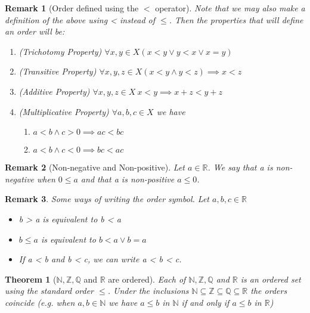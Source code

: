 \documentclass[11pt, oneside]{book}
\theoremstyle{break}
\newtheorem{thm}{Theorem}[section]
\newtheorem*{remark}{Remark}
\newcommand{\bb}[1]{\mathbb{#1}}		%
\begin{document}
\begin{remark}[Order defined using the $<$ operator]
	Note that we may also make a definition of the above using < instead of $\leq$. Then the properties that will define an order will be:
	\begin{enumerate}
		\item (Trichotomy Property) $\forall x, y \in X (x < y \lor y < x \lor x = y)$
		\item (Transitive Property) $\forall x, y, z \in X (x < y \land y < z) \implies x < z$
		\item (Additive Property) $\forall x, y, z \in X \> x < y \implies x + z < y + z$
		\item (Multiplicative Property) $\forall a, b, c \in X$ we have
		\begin{enumerate}
			\item $a < b \land c > 0 \implies ac < bc$ 
			\item $a < b \land c < 0 \implies bc < ac$

		\end{enumerate}
	\end{enumerate}
\end{remark}

\begin{remark}[Non-negative and Non-positive]
	 Let $a \in \bb{R}$. We say that a is non-negative when $0 \leq a$ and that a is non-positive $a \leq 0$.
\end{remark}

\begin{remark}
	Some ways of writing the order symbol. Let $a, b, c \in \bb{R}$
	\begin{itemize}
		\item b > a is equivalent to b < a
		\item $b \leq a$ is equivalent to $b < a \lor b = a$
		\item If a < b and b < c, we can write a < b < c.
	\end{itemize}
\end{remark}

\begin{thm}[$\bb{N}, \bb{Z}, \bb{Q}$ and $\bb{R}$ are ordered]
	Each of $\bb{N}, \bb{Z}, \bb{Q}$ and $\bb{R}$  is an ordered set using the standard order $\leq$. Under the inclusions $\bb{N} \subseteq \bb{Z} \subseteq \bb{Q} \subseteq \bb{R}$ the orders coincide (e.g. when $a, b \in \bb{N}$ we have $a \leq b$ in $\bb{N}$ if and only if $a \leq b$ in $\bb{R}$)
\end{thm}
\end{document}
